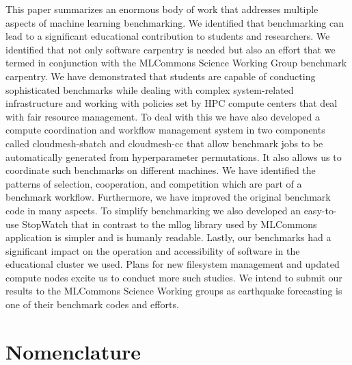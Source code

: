\documentclass[utf8]{FrontiersinVancouver} %
\newcommand{\TODO}[1]{\todo[inline]{#1}}
\begin{document}
{This paper summarizes an enormous body of work that addresses multiple
aspects of machine learning benchmarking. We identified that
benchmarking can lead to a significant educational contribution to
students and researchers. We identified that not only software
carpentry is needed but also an effort that we termed in conjunction
with the MLCommons Science Working Group benchmark carpentry. We have
demonstrated that students are capable of conducting sophisticated
benchmarks while dealing with complex system-related infrastructure
and working with policies set by HPC compute centers that deal with
fair resource management. To deal with this we have also developed a
compute coordination and workflow management system in two components
called cloudmesh-sbatch and cloudmesh-cc that allow benchmark jobs to
be automatically generated from hyperparameter permutations. It also
allows us to coordinate such benchmarks on different machines. We have
identified the patterns of selection, cooperation, and competition
which are part of a benchmark workflow. Furthermore, we have improved
the original benchmark code in many aspects. To simplify benchmarking
we also developed an easy-to-use StopWatch that in contrast to the
mllog library used by MLCommons application is simpler and is humanly
readable. Lastly, our benchmarks had a significant impact on the
operation and accessibility of software in the educational cluster we
used. Plans for new filesystem management and updated compute nodes
excite us to conduct more such studies. We intend to submit our
results to the MLCommons Science Working groups as earthquake
forecasting is one of their benchmark codes and efforts.

\clearpage

\section{Nomenclature}

}
\end{document}
